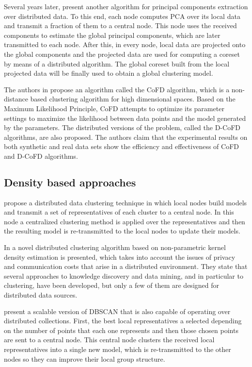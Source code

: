 \documentclass[a4paper]{article}
\begin{document}
Several years later, \cite{LBK13} present another algorithm for principal components extraction over distributed data. To this end, each node computes PCA over its local data and transmit a fraction of them to a central node. This node uses the received components to estimate the global principal components, which are later transmitted to each node. After this, in every node, local data are projected onto the global components and the projected data are used for computing a coreset by means of a distributed algorithm. The global coreset built from the local projected data will be finally used to obtain a global clustering model.  

The authors in \cite{LZO03} propose an algorithm called the CoFD algorithm, which is a non-distance based clustering algorithm for high dimensional spaces. Based on the Maximum Likelihood Principle, CoFD attempts to optimize its parameter settings to maximize the likelihood between data points and the model generated by the parameters. The distributed versions of the problem, called the D-CoFD algorithms, are also proposed. The authors claim that the experimental results on both synthetic and real data sets show the efficiency and effectiveness of CoFD and D-CoFD algorithms.

\subsection{Density based approaches}
\cite{JKP03} propose a distributed data clustering technique in which local nodes build models and transmit a set of representatives of each cluster to a central node. In this node a centralized clustering method is applied over the representatives and then the resulting model is re-transmitted to the local nodes to update their models.

In \cite{KLM03} a novel distributed clustering algorithm based on non-parametric kernel density estimation is presented, which takes into account the issues of privacy and communication costs that arise in a distributed environment. They state that several approaches to knowledge discovery and data mining, and in particular to clustering, have been developed, but only a few of them are designed for distributed data sources.

\cite{JKP04} present a scalable version of DBSCAN that is also capable of operating over distributed collections. First, the best local representatives a selected depending on the number of points that each one represents and then those chosen points are sent to a central node. This central node clusters the received local representatives into a single new model, which is re-transmitted to the other nodes so they can improve their local group structure.
\end{document}
